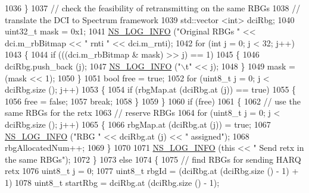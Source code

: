 \begin{DoxyCode}
1036             \}
1037           \textcolor{comment}{// check the feasibility of retransmitting on the same RBGs}
1038           \textcolor{comment}{// translate the DCI to Spectrum framework}
1039           std::vector <int> dciRbg;
1040           uint32\_t mask = 0x1;
1041           \hyperlink{group__logging_gafbd73ee2cf9f26b319f49086d8e860fb}{NS\_LOG\_INFO} (\textcolor{stringliteral}{"Original RBGs "} << dci.m\_rbBitmap << \textcolor{stringliteral}{" rnti "} << dci.m\_rnti);
1042           \textcolor{keywordflow}{for} (\textcolor{keywordtype}{int} j = 0; j < 32; j++)
1043             \{
1044               \textcolor{keywordflow}{if} (((dci.m\_rbBitmap & mask) >> j) == 1)
1045                 \{
1046                   dciRbg.push\_back (j);
1047                   \hyperlink{group__logging_gafbd73ee2cf9f26b319f49086d8e860fb}{NS\_LOG\_INFO} (\textcolor{stringliteral}{"\(\backslash\)t"} << j);
1048                 \}
1049               mask = (mask << 1);
1050             \}
1051           \textcolor{keywordtype}{bool} free = \textcolor{keyword}{true};
1052           \textcolor{keywordflow}{for} (uint8\_t j = 0; j < dciRbg.size (); j++)
1053             \{
1054               \textcolor{keywordflow}{if} (rbgMap.at (dciRbg.at (j)) == \textcolor{keyword}{true})
1055                 \{
1056                   free = \textcolor{keyword}{false};
1057                   \textcolor{keywordflow}{break};
1058                 \}
1059             \}
1060           \textcolor{keywordflow}{if} (free)
1061             \{
1062               \textcolor{comment}{// use the same RBGs for the retx}
1063               \textcolor{comment}{// reserve RBGs}
1064               \textcolor{keywordflow}{for} (uint8\_t j = 0; j < dciRbg.size (); j++)
1065                 \{
1066                   rbgMap.at (dciRbg.at (j)) = \textcolor{keyword}{true};
1067                   \hyperlink{group__logging_gafbd73ee2cf9f26b319f49086d8e860fb}{NS\_LOG\_INFO} (\textcolor{stringliteral}{"RBG "} << dciRbg.at (j) << \textcolor{stringliteral}{" assigned"});
1068                   rbgAllocatedNum++;
1069                 \}
1070 
1071               \hyperlink{group__logging_gafbd73ee2cf9f26b319f49086d8e860fb}{NS\_LOG\_INFO} (\textcolor{keyword}{this} << \textcolor{stringliteral}{" Send retx in the same RBGs"});
1072             \}
1073           \textcolor{keywordflow}{else}
1074             \{
1075               \textcolor{comment}{// find RBGs for sending HARQ retx}
1076               uint8\_t j = 0;
1077               uint8\_t rbgId = (dciRbg.at (dciRbg.size () - 1) + 1) %
1078               uint8\_t startRbg = dciRbg.at (dciRbg.size () - 1);

\end{DoxyCode}
